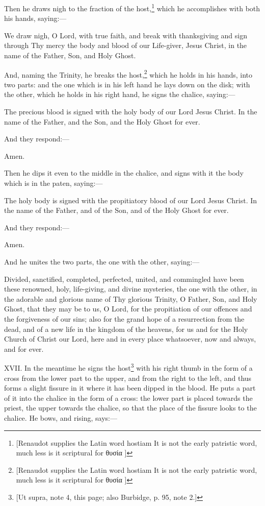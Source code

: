 Then he draws nigh to the fraction of the host,\footnote{\par{}  [Renaudot supplies the Latin word hostiam It is not the early patristic word, much less is it scriptural for \textgreek{θυσία} ]} which he accomplishes with both his hands, saying:—

We draw nigh, O Lord, with true faith, and break with thanksgiving and sign through Thy mercy the body and blood of our Life-giver, Jesus Christ, in the name of the Father, Son, and Holy Ghost.

And, naming the Trinity, he breaks the host,\footnote{\par{}  [Renaudot supplies the Latin word hostiam It is not the early patristic word, much less is it scriptural for \textgreek{θυσία} ]} which he holds in his hands, into two parts: and the one which is in his left hand he lays down on the disk; with the other, which he holds in his right hand, he signs the chalice, saying:—

The precious blood is signed with the holy body of our Lord Jesus Christ. In the name of the Father, and the Son, and the Holy Ghost for ever.

And they respond:—

Amen.

Then he dips it even to the middle in the chalice, and signs with it the body which is in the paten, saying:—

The holy body is signed with the propitiatory blood of our Lord Jesus Christ. In the name of the Father, and of the Son, and of the Holy Ghost for ever.

And they respond:—

Amen.

And he unites the two parts, the one with the other, saying:—

Divided, sanctified, completed, perfected, united, and commingled have been these renowned, holy, life-giving, and divine mysteries, the one with the other, in the adorable and glorious name of Thy glorious Trinity, O Father, Son, and Holy Ghost, that they may be to us, O Lord, for the propitiation of our offences and the forgiveness of our sins; also for the grand hope of a resurrection from the dead, and of a new life in the kingdom of the heavens, for us and for the Holy Church of Christ our Lord, here and in every place whatsoever, now and always, and for ever.

XVII. In the meantime he signs the host\footnote{\par{}  [Ut supra, note 4, this page; also Burbidge, p. 95, note 2.]} with his right thumb in the form of a cross from the lower part to the upper, and from the right to the left, and thus forms a slight fissure in it where it has been dipped in the blood. He puts a part of it into the chalice in the form of a cross: the lower part is placed towards the priest, the upper towards the chalice, so that the place of the fissure looks to the chalice. He bows, and rising, says:—

